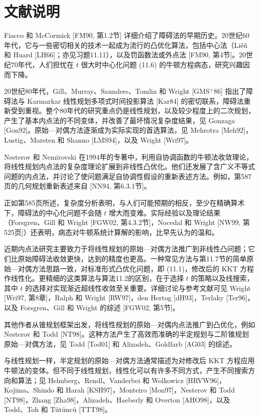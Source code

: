 \section*{文献说明}
Fiacco 和 McCormick [FM90, 第1.2节] 详细介绍了障碍法的早期历史。20世纪60年代，它与一些密切相关的技术一起成为流行的凸优化算法，包括中心法（Li\^e\~u 和 Huard [LH66]；亦见习题11.11），以及罚函数法或外点法 [FM90, 第4节]。20世纪70年代，人们担忧在 $t$ 很大时中心化问题 (11.6) 的牛顿方程病态，研究兴趣因而下降。

20世纪80年代，Gill、Murray、Saunders、Tomlin 和 Wright [GMS$^+$86] 指出了障碍法与 Karmarkar 线性规划多项式时间投影算法 [Kar84] 的密切联系，障碍法重新受到重视。整个80年代的研究重点仍是线性规划，以及较少程度上的二次规划，产生了基本内点法的不同变体，并改善了最坏情况复杂度结果，见 Gonzaga [Gon92]。原始—对偶方法逐渐成为实际实现的首选算法，见 Mehrotra [Meh92]，Lustig、Marsten 和 Shanno [LMS94]，以及 Wright [Wri97]。

Nesterov 和 Nemirovski 在1994年的专著中，利用自协调函数的牛顿法收敛理论，将线性规划内点法的复杂度理论扩展到非线性凸优化。他们还发展了含广义不等式问题的内点法，并讨论了使问题满足自协调性假设的重新表述方法。例如，第587页的几何规划重新表述来自 [NN94, 第6.3.1节]。

正如第585页所述，复杂度分析表明，与人们可能预期的相反，至少在精确算术下，障碍法的中心化问题不会随 $t$ 增大而变难。实际经验以及理论结果（Forsgren、Gill 和 Wright [FGW02, 第4.3.2节]，Nocedal 和 Wright [NW99, 第525页]）还表明，病态对牛顿系统计算解的影响，比早先认为的温和。

近期内点法研究主要致力于将线性规划的原始—对偶方法推广到非线性凸问题；它们比原始障碍法收敛更快，达到的精度也更高。一种常见方法与第11.7节的简单原始—对偶方法思路一致，对标准形式凸优化问题，即 (11.1)，修改后的 KKT 方程作线性化。更精细的这类算法与算法11.2的区别，在于选择 $t$ 的策略以及线搜索，其中 $t$ 的选择对实现渐近超线性收敛至关重要。详细讨论与参考文献可见 Wright [Wri97, 第8章]，Ralph 和 Wright [RW97]，den Hertog [dH93]，Terlaky [Ter96]，以及 Forsgren、Gill 和 Wright 的综述 [FGW02, 第5节]。

其他作者从锥规划框架出发，将线性规划的原始—对偶内点法推广到凸优化，例如 Nesterov 和 Todd [NT98]。这种方法产生了高效而准确的半定规划与二阶锥规划原始—对偶方法，见 Todd [Tod01] 和 Alizadeh、Goldfarb [AG03] 的综述。

与线性规划一样，半定规划的原始—对偶方法通常描述为对修改后 KKT 方程应用牛顿法的变体。但不同于线性规划，线性化可以有许多不同方式，产生不同搜索方向和算法；见 Helmberg、Rendl、Vanderbei 和 Wolkowicz [HRVW96]，Kojima、Shindo 和 Harah [KSH97]，Monteiro [Mon97]，Nesterov 和 Todd [NT98]，Zhang [Zha98]，Alizadeh、Haeberly 和 Overton [AHO98]，以及 Todd、Toh 和 T\"ut\"unc\"u [TTT98]。

